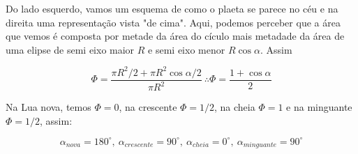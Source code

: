 \documentclass[11pt]{article}
\begin{document}
\begin{pproblem}
\begin{pssolution*}{}{}
    Do lado esquerdo, vamos um esquema de como o plaeta se parece no céu e na direita uma representação vista "de cima". Aqui, podemos perceber que a área que vemos é composta por metade da área do cículo mais metadade da área de uma elipse de semi eixo maior \(R\) e semi eixo menor \(R\cos\alpha\). Assim

    \[\Phi = \frac{\pi R^2/2 + \pi R^2\cos\alpha/2}{\pi R^2} \ \boxed{\therefore \Phi = \frac{1+\cos\alpha}{2}}\]

    Na Lua nova, temos \(\Phi = 0\), na crescente \(\Phi = 1/2\), na cheia \(\Phi = 1\) e na minguante \(\Phi = 1/2\), assim:

    \[\boxed{\alpha_{nova} = 180^\circ, \ \alpha_{crescente} = 90^\circ, \ \alpha_{cheia} = 0^\circ, \ \alpha_{minguante} = 90^\circ}\]
\end{pssolution*}
\end{pproblem}
\end{document}
